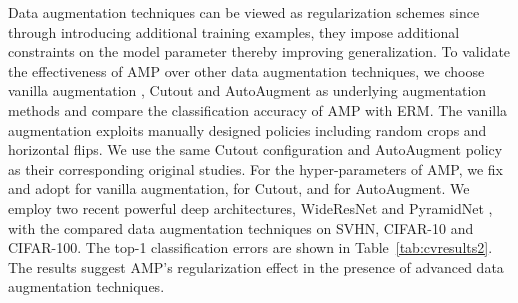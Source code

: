 \documentclass[final]{cvpr}
\begin{document}
Data augmentation techniques can be viewed as regularization schemes since through introducing additional training examples, they impose additional constraints on the model parameter thereby improving generalization. To validate the effectiveness of AMP over other data augmentation techniques, we choose vanilla augmentation \cite{krizhevsky2012imagenet}, Cutout \cite{devries2017improved} and AutoAugment \cite{cubuk2019autoaugment} as underlying augmentation methods and compare the classification accuracy of AMP with ERM. The vanilla augmentation exploits manually designed policies including random crops and horizontal flips. We use the same Cutout configuration and AutoAugment policy as their corresponding original studies. For the hyper-parameters of AMP, we fix  and adopt  for vanilla augmentation,  for Cutout, and  for AutoAugment. We employ two recent powerful deep architectures, WideResNet \cite{zagoruyko2016wide} and PyramidNet \cite{han2017pyramid}, with the compared data augmentation techniques on SVHN, CIFAR-10 and CIFAR-100. The top-1 classification errors are shown in Table~\ref{tab:cvresults2}. The results suggest AMP's regularization effect in the presence of advanced data augmentation techniques.

\begin{table}[t]
\centering
{}
\caption{Mean and standard deviation of top-1 errors (\%) on SVHN, CIFAR-10 and CIFAR-100 over 10 trials.}
\label{tab:cvresults2}
\end{table}
\end{document}

